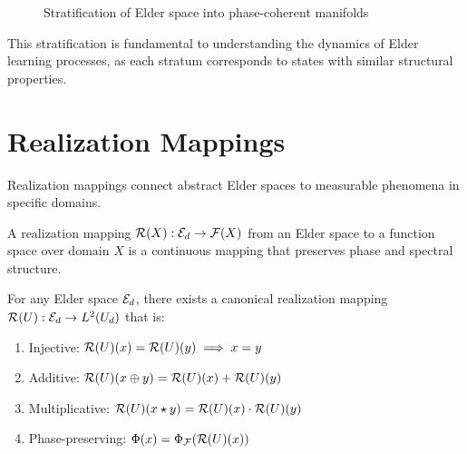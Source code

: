 \begin{figure}[ht]
\centering
{}
\caption{Stratification of Elder space into phase-coherent manifolds}
\label{fig:elder-stratification}
\end{figure}

This stratification is fundamental to understanding the dynamics of Elder learning processes, as each stratum corresponds to states with similar structural properties.

\section{Realization Mappings}

Realization mappings connect abstract Elder spaces to measurable phenomena in specific domains.

\begin{definition}
A realization mapping $\mathcal{R}(X): \mathcal{E}_{d} \rightarrow \mathcal{F}(X)$ from an Elder space to a function space over domain $X$ is a continuous mapping that preserves phase and spectral structure.
\end{definition}

\begin{theorem}
For any Elder space $\mathcal{E}_{d}$, there exists a canonical realization mapping $\mathcal{R}(U): \mathcal{E}_{d} \rightarrow L^2(U_d)$ that is:
\begin{enumerate}
    \item Injective: $\mathcal{R}(U)(x) = \mathcal{R}(U)(y) \implies x = y$
    \item Additive: $\mathcal{R}(U)(x \oplus y) = \mathcal{R}(U)(x) + \mathcal{R}(U)(y)$
    \item Multiplicative: $\mathcal{R}(U)(x \star y) = \mathcal{R}(U)(x) \cdot \mathcal{R}(U)(y)$
    \item Phase-preserving: $\Phi(x) = \Phi_{\mathcal{F}}(\mathcal{R}(U)(x))$
\end{enumerate}
\end{theorem}

